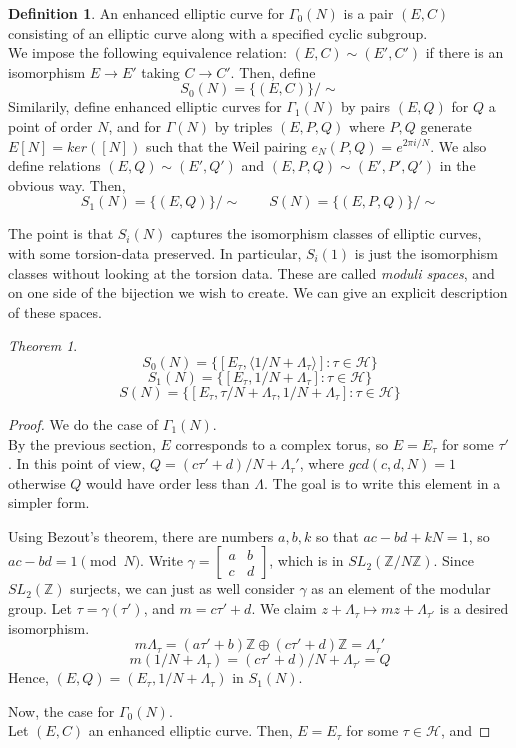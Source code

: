 \documentclass[11pt]{article}
\theoremstyle{definition}
\newtheorem{definition}{Definition}[section]
\theoremstyle{example}
\theoremstyle{remark}
\theoremstyle{lemma}
\theoremstyle{proposition}
\theoremstyle{Problem}
\theoremstyle{Solution}
\theoremstyle{theorem}
\newtheorem{theorem}{Theorem}[section]
\theoremstyle{corollary}
\begin{document}
\begin{definition}
An enhanced elliptic curve for $\Gamma_0(N)$ is a pair $(E, C)$ consisting of an elliptic curve along with a specified cyclic subgroup.\\
We impose the following equivalence relation: $(E,C) \sim (E',C')$ if there is an isomorphism $E\to E'$ taking $C\to C'$. Then, define
$$S_0(N) = \{(E,C)\}/\sim$$
Similarily, define enhanced elliptic curves for $\Gamma_1(N)$ by pairs $(E,Q)$ for $Q$ a point of order $N$, and for $\Gamma(N)$ by triples $(E, P, Q)$ where $P,Q$ generate $E[N] = ker([N])$ such that the Weil pairing $e_N(P,Q)=e^{2\pi i/N}$. We also define relations $(E,Q)\sim(E',Q')$ and $(E,P,Q) \sim (E',P',Q')$ in the obvious way. Then,
$$S_1(N)=\{(E,Q)\}/\sim \qquad S(N) = \{(E,P,Q)\}/\sim$$
\end{definition}
The point is that $S_i(N)$ captures the isomorphism classes of elliptic curves, with some torsion-data preserved. In particular, $S_i(1)$ is just the isomorphism classes without looking at the torsion data. These are called \textit{moduli spaces}, and on one side of the bijection we wish to create. We can give an explicit description of these spaces.
\begin{theorem}
$$S_0(N)=\{[E_\tau, \langle 1/N + \Lambda_\tau\rangle] : \tau\in\mathcal{H}\}$$
$$S_1(N)=\{[E_\tau,  1/N + \Lambda_\tau] : \tau\in\mathcal{H}\}$$
$$S(N)=\{[E_\tau,  \tau/N + \Lambda_\tau, 1/N + \Lambda_\tau] : \tau\in\mathcal{H}\}$$
\end{theorem}
\begin{proof}
We do the case of $\Gamma_1(N)$.\\
By the previous section, $E$ corresponds to a complex torus, so $E=E_\tau$ for some $\tau'$. In this point of view, $Q = (c\tau'+d)/N + \Lambda_\tau'$, where $gcd(c,d,N)=1$ otherwise $Q$ would have order less than $\Lambda$. The goal is to write this element in a simpler form.

Using Bezout's theorem, there are numbers $a,b,k$ so that $ac-bd+kN=1$, so $ac-bd=1\pmod{N}$. Write $\gamma=\begin{bmatrix}a & b \\ c & d\end{bmatrix}$, which is in $SL_2(\mathbb{Z}/N\mathbb{Z})$. Since $SL_2(\mathbb{Z})$ surjects, we can just as well consider $\gamma$ as an element of the modular group. Let $\tau = \gamma(\tau')$, and $m = c\tau'+d$. We claim $z+\Lambda_{\tau}\mapsto mz+\Lambda_{\tau'}$ is a desired isomorphism.\\
$$m\Lambda_\tau = (a\tau'+b)\mathbb{Z}\oplus(c\tau'+d)\mathbb{Z}=\Lambda_\tau'$$
$$m(1/N+\Lambda_{\tau}) = (c\tau'+d)/N+\Lambda_{\tau'}=Q$$
Hence, $(E,Q) = (E_\tau, 1/N+\Lambda_\tau)$ in $S_1(N)$.


Now, the case for $\Gamma_0(N)$.\\
Let $(E,C)$ an enhanced elliptic curve. Then, $E=E_\tau$ for some $\tau\in\mathcal{H}$, and 
\end{proof}
\end{document}
